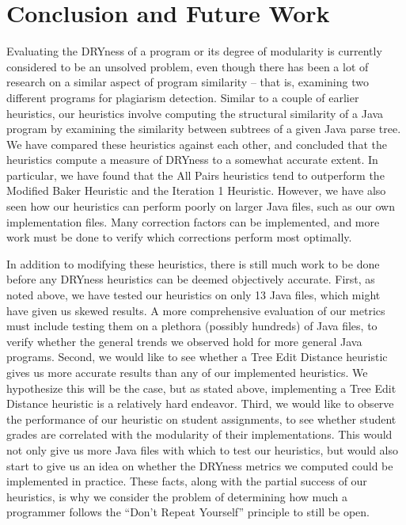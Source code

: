 \documentclass{article}
\begin{document}
\section{Conclusion and Future Work}

Evaluating the DRYness of a program or its degree of modularity is currently considered to be an unsolved problem,
even though there has been a lot of research on a similar aspect of program similarity -- that is, examining two
different programs for plagiarism detection. Similar to a couple of earlier heuristics, our heuristics involve
computing the structural similarity of a Java program by examining the similarity between subtrees of a given Java parse tree. 
We have compared these heuristics against each other, and concluded that the heuristics compute a measure of DRYness to a 
somewhat accurate extent. In particular, we have found that the All Pairs heuristics tend to outperform the Modified Baker Heuristic
and the Iteration 1 Heuristic. However, we have also seen how our heuristics can perform poorly on larger Java files, such as our
own implementation files. Many correction factors can be implemented, and more work must be done to verify which corrections
perform most optimally.

In addition to modifying these heuristics, there is still much work to be done before any DRYness heuristics can be deemed objectively
accurate. First, as noted above, we have tested our heuristics on only 13 Java files, which might have given us skewed results. A more
comprehensive evaluation of our metrics must include testing them on a plethora (possibly hundreds) of Java files, to verify whether
the general trends we observed hold for more general Java programs. Second, we would like to see whether a Tree Edit Distance heuristic
gives us more accurate results than any of our implemented heuristics. We hypothesize this will be the case, but as stated above, 
implementing a Tree Edit Distance heuristic is a relatively hard endeavor. Third, we would like to observe the performance of our
heuristic on student assignments, to see whether student grades are correlated with the modularity of their implementations. This would not only give us more Java files with which to test our heuristics, but would also start to give us an idea on whether
the DRYness metrics we computed could be implemented in practice. These facts, along with the partial success of our heuristics, is why
we consider the problem of determining how much a programmer follows the ``Don't Repeat Yourself'' principle to still be open.
\end{document}
